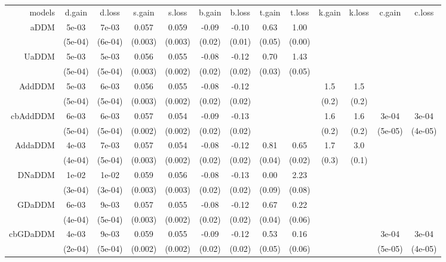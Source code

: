 \begin{table}[ht]
\centering
\begin{tabular}{|r|cc|cc|cc|cc|cc|cc|}
 models & d.gain & d.loss & s.gain & s.loss & b.gain & b.loss & t.gain & t.loss & k.gain & k.loss & c.gain & c.loss \\ 
 aDDM & 5e-03 & 7e-03 & 0.057 & 0.059 & -0.09 & -0.10 &  0.63 &  1.00 &  &  &  &  \\ 
   & (5e-04) & (6e-04) & (0.003) & (0.003) & (0.02) & (0.01) & (0.05) & (0.00) &  &  &  &  \\ 
   \hline
UaDDM & 5e-03 & 5e-03 & 0.056 & 0.055 & -0.08 & -0.12 &  0.70 &  1.43 &  &  &  &  \\ 
   & (5e-04) & (5e-04) & (0.003) & (0.002) & (0.02) & (0.02) & (0.03) & (0.05) &  &  &  &  \\ 
   \hline
AddDDM & 5e-03 & 6e-03 & 0.056 & 0.055 & -0.08 & -0.12 &  &  & 1.5 & 1.5 &  &  \\ 
   & (5e-04) & (5e-04) & (0.003) & (0.002) & (0.02) & (0.02) &  &  & (0.2) & (0.2) &  &  \\ 
   \hline
cbAddDDM & 6e-03 & 6e-03 & 0.057 & 0.054 & -0.09 & -0.13 &  &  & 1.6 & 1.6 & 3e-04 & 3e-04 \\ 
   & (5e-04) & (5e-04) & (0.002) & (0.002) & (0.02) & (0.02) &  &  & (0.2) & (0.2) & (5e-05) & (4e-05) \\ 
   \hline
AddaDDM & 4e-03 & 7e-03 & 0.057 & 0.054 & -0.08 & -0.12 &  0.81 &  0.65 & 1.7 & 3.0 &  &  \\ 
   & (4e-04) & (5e-04) & (0.003) & (0.002) & (0.02) & (0.02) & (0.04) & (0.02) & (0.3) & (0.1) &  &  \\ 
   \hline
DNaDDM & 1e-02 & 1e-02 & 0.059 & 0.056 & -0.08 & -0.13 &  0.00 &  2.23 &  &  &  &  \\ 
   & (3e-04) & (3e-04) & (0.003) & (0.003) & (0.02) & (0.02) & (0.09) & (0.08) &  &  &  &  \\ 
   \hline
GDaDDM & 6e-03 & 9e-03 & 0.057 & 0.055 & -0.08 & -0.12 &  0.67 &  0.22 &  &  &  &  \\ 
   & (4e-04) & (5e-04) & (0.003) & (0.002) & (0.02) & (0.02) & (0.04) & (0.06) &  &  &  &  \\ 
   \hline
cbGDaDDM & 4e-03 & 9e-03 & 0.059 & 0.055 & -0.09 & -0.12 &  0.53 &  0.16 &  &  & 3e-04 & 3e-04 \\ 
   & (2e-04) & (5e-04) & (0.002) & (0.002) & (0.02) & (0.02) & (0.05) & (0.06) &  &  & (5e-05) & (4e-05) \\ 

\end{tabular}
\end{table}
